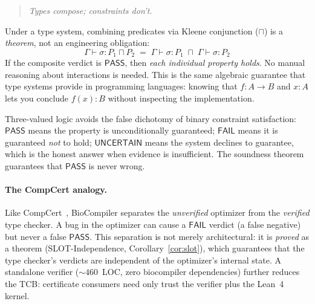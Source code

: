 \documentclass[acmsmall,review,anonymous]{acmart}
\newcommand{\PASS}{\ensuremath{\mathsf{PASS}}\xspace}
\newcommand{\FAIL}{\ensuremath{\mathsf{FAIL}}\xspace}
\newcommand{\UNCERTAIN}{\ensuremath{\mathsf{UNCERTAIN}}\xspace}
\newcommand{\seq}{\sigma}
\newcommand{\pred}{P}
\newcommand{\judg}[3]{#1 \vdash #2 : #3}
\begin{document}
\begin{quote}
\emph{Types compose; constraints don't.}
\end{quote}

\noindent Under a type system, combining predicates via Kleene
conjunction ($\sqcap$) is a \emph{theorem}, not an engineering
obligation:
\[
  \judg{\Gamma}{\seq}{\pred_1 \sqcap \pred_2}
  \;=\;
  \judg{\Gamma}{\seq}{\pred_1} \;\sqcap\;
  \judg{\Gamma}{\seq}{\pred_2}
\]
If the composite verdict is \PASS, then \emph{each individual property
holds}. No manual reasoning about interactions is needed. This is the
same algebraic guarantee that type systems provide in programming
languages: knowing that $f : A \to B$ and $x : A$ lets you conclude
$f(x) : B$ without inspecting the implementation.

Three-valued logic avoids the false dichotomy of binary constraint
satisfaction: \PASS{} means the property is unconditionally guaranteed;
\FAIL{} means it is guaranteed \emph{not} to hold; \UNCERTAIN{} means
the system declines to guarantee, which is the honest answer when
evidence is insufficient.
The soundness theorem guarantees that \PASS{} is never wrong.

\paragraph{The CompCert analogy.}
Like CompCert~\cite{leroy2009compcert}, BioCompiler separates the
\emph{unverified} optimizer from the \emph{verified} type checker.
A bug in the optimizer can cause a \FAIL{} verdict (a false negative)
but never a false \PASS.
This separation is not merely architectural: it is \emph{proved} as a
theorem (SLOT-Independence, Corollary~\ref{cor:slot}), which
guarantees that the type checker's verdicts are independent of the
optimizer's internal state.
A standalone verifier (${\sim}460$~LOC, zero biocompiler dependencies)
further reduces the TCB: certificate consumers need only trust the
verifier plus the Lean~4 kernel.
\end{document}
